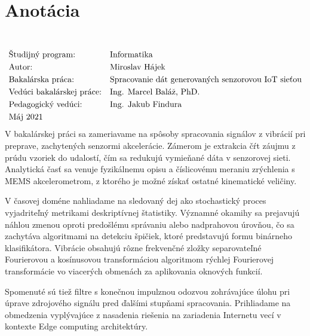 \thispagestyle{empty}
\section*{Anotácia}
\University \\
\uppercase{\Faculty}
\vspace{-8pt}
{\setlength{\mathindent}{0cm}
\begin{align*}
&\text{Študijný program:} && \text{\StudyProgramme} \\
&\text{Autor:} && \text{\Author} \\
&\text{\Thesis:} && \text{\Title} \\
&\text{Vedúci bakalárskej práce:} && \text{\Supervisor} \\
&\text{Pedagogický vedúci:} && \text{\PedagogicalSupervisor} \\
&\text{\Date}
\end{align*}}
V bakalárskej práci sa zameriavame na spôsoby spracovania signálov z vibrácií pri preprave, zachytených
senzormi akcelerácie. Zámerom je extrakcia čŕt záujmu z prúdu vzoriek do udalostí, čím sa redukujú vymieňané
dáta v senzorovej sieti. Analytická časť sa venuje fyzikálnemu opisu a číslicovému meraniu zrýchlenia s MEMS akcelerometrom,
z ktorého je možné získať ostatné kinematické veličiny. 

V časovej doméne nahliadame na sledovaný dej ako stochastický
proces vyjadriteľný metrikami deskriptívnej štatistiky. Významné okamihy sa prejavujú náhlou zmenou oproti predošlému správaniu
alebo nadprahovou úrovňou, čo sa zachytáva algoritmami na detekciu špičiek, ktoré predstavujú formu binárneho klasifikátora.
Vibrácie obsahujú rôzne frekvenčné zložky separovateľné Fourierovou a kosínusovou transformáciou algoritmom rýchlej Fourierovej
transformácie vo viacerých obmenách za aplikovania oknových funkcií. 

Spomenuté sú tiež filtre s konečnou impulznou odozvou
zohrávajúce úlohu pri úprave zdrojového signálu pred ďalšími stupňami spracovania. Prihliadame na obmedzenia vyplývajúce
z nasadenia riešenia na zariadenia Internetu vecí v kontexte Edge computing architektúry.

\emptypage

\thispagestyle{empty}
